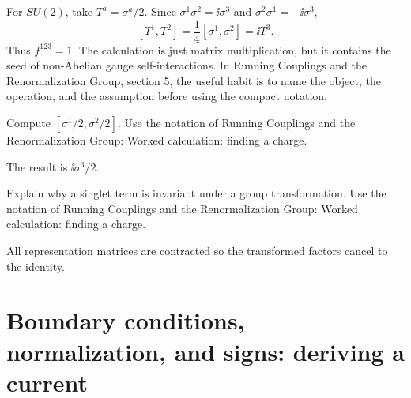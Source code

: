 \begin{example}
For \(SU(2)\), take \(T^a=\sigma^a/2\).  Since \(\sigma^1\sigma^2=\ii\sigma^3\) and \(\sigma^2\sigma^1=-\ii\sigma^3\),
\[
  [T^1,T^2]=\frac14[\sigma^1,\sigma^2]=\ii T^3.
\]
Thus \(f^{123}=1\).  The calculation is just matrix multiplication, but it contains the seed of non-Abelian gauge self-interactions.  In Running Couplings and the Renormalization Group, section 5, the useful habit is to name the object, the operation, and the assumption before using the compact notation.
\end{example}



\begin{exercise}
Compute \([\sigma^1/2,\sigma^2/2]\).  Use the notation of Running Couplings and the Renormalization Group: Worked calculation: finding a charge.
\begin{answer}
The result is \(\ii\sigma^3/2\).
\end{answer}
\end{exercise}

\begin{exercise}
Explain why a singlet term is invariant under a group transformation.  Use the notation of Running Couplings and the Renormalization Group: Worked calculation: finding a charge.
\begin{answer}
All representation matrices are contracted so the transformed factors cancel to the identity.
\end{answer}
\end{exercise}



\section{Boundary conditions, normalization, and signs: deriving a current}













